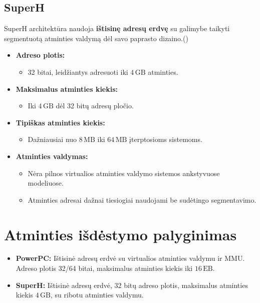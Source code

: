 \documentclass{article}
\begin{document}
\subsection{SuperH}
SuperH architektūra naudoja \textbf{ištisinę adresų erdvę} su galimybe taikyti segmentuotą atminties valdymą dėl savo paprasto dizaino.(\citealp{Wikipedia2024})

\begin{itemize}
    \item \textbf{Adreso plotis:} 
        \begin{itemize}
            \item 32 bitai, leidžiantys adresuoti iki \( 4 \, \text{GB} \) atminties.
        \end{itemize}
    \item \textbf{Maksimalus atminties kiekis:}
        \begin{itemize}
            \item Iki \( 4 \, \text{GB} \) dėl 32 bitų adresų pločio.
        \end{itemize}
    \item \textbf{Tipiškas atminties kiekis:}
        \begin{itemize}
            \item Dažniausiai nuo \( 8 \, \text{MB} \) iki \( 64 \, \text{MB} \) įterptosioms sistemoms.
        \end{itemize}
    \item \textbf{Atminties valdymas:}
        \begin{itemize}
            \item Nėra pilnos virtualios atminties valdymo sistemos ankstyvuose modeliuose.
            \item Atminties adresai dažnai tiesiogiai naudojami be sudėtingo segmentavimo.
        \end{itemize}
\end{itemize}

\section*{Atminties išdėstymo palyginimas}
\begin{itemize}
    \item \textbf{PowerPC:} Ištisinė adresų erdvė su virtualios atminties valdymu ir MMU. Adreso plotis 32/64 bitai, maksimalus atminties kiekis iki \( 16 \, \text{EB} \).
    \item \textbf{SuperH:} Ištisinė adresų erdvė, 32 bitų adreso plotis, maksimalus atminties kiekis \( 4 \, \text{GB} \), su ribotu atminties valdymu.
\end{itemize}
\end{document}
